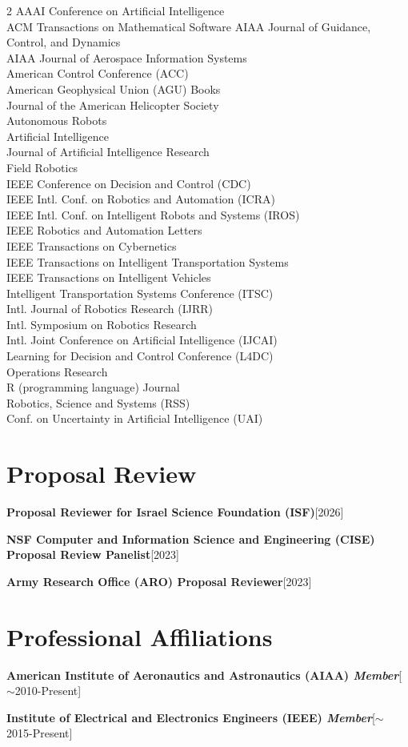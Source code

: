 \documentclass[10pt,roman]{moderncv}
\newcommand{\mycvitem}[2]{
    \textbf{#2}\hfill [#1]\break
}
\begin{document}
\vspace{-2ex}
\begin{multicols}{2}
\small
AAAI Conference on Artificial Intelligence\\
ACM Transactions on Mathematical Software
AIAA Journal of Guidance, Control, and Dynamics\\
AIAA Journal of Aerospace Information Systems\\
American Control Conference (ACC)\\
American Geophysical Union (AGU) Books\\
Journal of the American Helicopter Society\\
Autonomous Robots\\
Artificial Intelligence\\
Journal of Artificial Intelligence Research\\
Field Robotics\\
IEEE Conference on Decision and Control (CDC)\\
IEEE Intl. Conf. on Robotics and Automation (ICRA)\\
IEEE Intl. Conf. on Intelligent Robots and Systems (IROS)\\
IEEE Robotics and Automation Letters\\
IEEE Transactions on Cybernetics\\
IEEE Transactions on Intelligent Transportation Systems\\
IEEE Transactions on Intelligent Vehicles\\
Intelligent Transportation Systems Conference (ITSC)\\
Intl. Journal of Robotics Research (IJRR)\\
Intl. Symposium on Robotics Research\\
Intl. Joint Conference on Artificial Intelligence (IJCAI)\\
Learning for Decision and Control Conference (L4DC)\\
Operations Research\\
R (programming language) Journal\\
Robotics, Science and Systems (RSS)\\
Conf. on Uncertainty in Artificial Intelligence (UAI)\\
\end{multicols}

\section{Proposal Review}
\mycvitem{2026}{Proposal Reviewer for Israel Science Foundation (ISF)}
\mycvitem{2023}{NSF Computer and Information Science and Engineering (CISE) Proposal Review Panelist}
\mycvitem{2023}{Army Research Office (ARO) Proposal Reviewer}

\section{Professional Affiliations}
\mycvitem{$\sim$2010-Present}{American Institute of Aeronautics and Astronautics (AIAA) \textit{Member}}
\mycvitem{$\sim$2015-Present}{Institute of Electrical and Electronics Engineers (IEEE) \textit{Member}}
\end{document}
